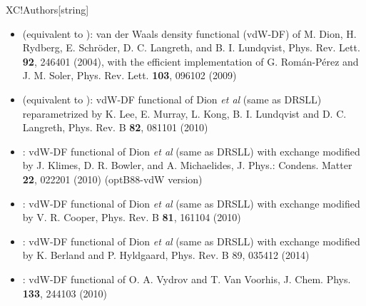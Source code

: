 \begin{fdfentry}{XC!Authors}[string]
\begin{itemize}
    \item%
     (equivalent to ): 
    van der Waals  density functional (vdW-DF) 
    of M. Dion, H. Rydberg, E. Schr\"{o}der, D. C. Langreth, and B. I. Lundqvist,
    Phys. Rev. Lett. \textbf{92}, 246401 (2004), with the efficient implementation of 
    G. Rom\'an-P\'erez and J. M. Soler, Phys. Rev. Lett. \textbf{103},  096102 (2009)
    
    \item%
     (equivalent to ):  %
    vdW-DF functional of Dion \textit{et al} (same as DRSLL)
    reparametrized by K. Lee, E. Murray, L. Kong, B. I. Lundqvist and 
    D. C. Langreth, Phys. Rev. B \textbf{82}, 081101 (2010)

    \item%
    : %
    vdW-DF functional of Dion \textit{et al} (same as DRSLL)
    with exchange modified by J. Klimes, D. R. Bowler, and A. Michaelides, 
    J. Phys.: Condens. Matter \textbf{22}, 022201 (2010) (optB88-vdW version)
    
    \item%
    : %
    vdW-DF functional of Dion \textit{et al} (same as DRSLL)
    with exchange modified by V. R. Cooper, Phys. Rev. B \textbf{81}, 161104 (2010)
    
    \item%
    : %
    vdW-DF functional of Dion \textit{et al} (same as DRSLL) 
    with exchange modified by 
    K. Berland and P. Hyldgaard, Phys. Rev. B 89, 035412 (2014)
    
    \item%
    : %
    vdW-DF functional of O. A. Vydrov and T. Van Voorhis, 
    J. Chem. Phys. \textbf{133}, 244103 (2010)
    
  \end{itemize}

\end{fdfentry}


